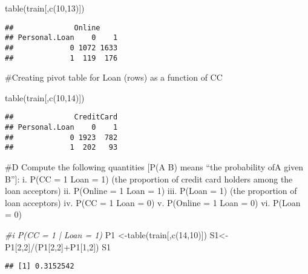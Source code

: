 \documentclass[
]{article}
\newenvironment{Shaded}{\begin{snugshade}}{\end{snugshade}}
\newcommand{\CommentTok}[1]{\textcolor[rgb]{0.56,0.35,0.01}{\textit{#1}}}
\newcommand{\DecValTok}[1]{\textcolor[rgb]{0.00,0.00,0.81}{#1}}
\newcommand{\FunctionTok}[1]{\textcolor[rgb]{0.00,0.00,0.00}{#1}}
\newcommand{\NormalTok}[1]{#1}
\newcommand{\OtherTok}[1]{\textcolor[rgb]{0.56,0.35,0.01}{#1}}
\newcommand{\SpecialCharTok}[1]{\textcolor[rgb]{0.00,0.00,0.00}{#1}}
\begin{document}
\begin{Shaded}
\begin{Highlighting}[]
\FunctionTok{table}\NormalTok{(train[,}\FunctionTok{c}\NormalTok{(}\DecValTok{10}\NormalTok{,}\DecValTok{13}\NormalTok{)])}
\end{Highlighting}
\end{Shaded}

\begin{verbatim}
##              Online
## Personal.Loan    0    1
##             0 1072 1633
##             1  119  176
\end{verbatim}

\#Creating pivot table for Loan (rows) as a function of CC

\begin{Shaded}
\begin{Highlighting}[]
\FunctionTok{table}\NormalTok{(train[,}\FunctionTok{c}\NormalTok{(}\DecValTok{10}\NormalTok{,}\DecValTok{14}\NormalTok{)])}
\end{Highlighting}
\end{Shaded}

\begin{verbatim}
##              CreditCard
## Personal.Loan    0    1
##             0 1923  782
##             1  202   93
\end{verbatim}

\#D Compute the following quantities {[}P(A \textbar{} B) means ``the
probability ofA given B''{]}: i. P(CC = 1 \textbar{} Loan = 1) (the
proportion of credit card holders among the loan acceptors) ii. P(Online
= 1 \textbar{} Loan = 1) iii. P(Loan = 1) (the proportion of loan
acceptors) iv. P(CC = 1 \textbar{} Loan = 0) v. P(Online = 1 \textbar{}
Loan = 0) vi. P(Loan = 0)

\begin{Shaded}
\begin{Highlighting}[]
\CommentTok{\#i P(CC = 1 | Loan = 1)}
\NormalTok{P1 }\OtherTok{\textless{}{-}}\FunctionTok{table}\NormalTok{(train[,}\FunctionTok{c}\NormalTok{(}\DecValTok{14}\NormalTok{,}\DecValTok{10}\NormalTok{)])}
\NormalTok{S1}\OtherTok{\textless{}{-}}\NormalTok{ P1[}\DecValTok{2}\NormalTok{,}\DecValTok{2}\NormalTok{]}\SpecialCharTok{/}\NormalTok{(P1[}\DecValTok{2}\NormalTok{,}\DecValTok{2}\NormalTok{]}\SpecialCharTok{+}\NormalTok{P1[}\DecValTok{1}\NormalTok{,}\DecValTok{2}\NormalTok{])}
\NormalTok{S1}
\end{Highlighting}
\end{Shaded}

\begin{verbatim}
## [1] 0.3152542
\end{verbatim}
\end{document}
